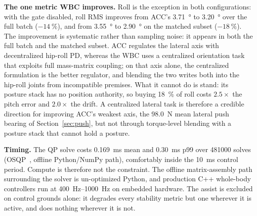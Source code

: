 \documentclass[a4paper,fleqn]{cas-dc}
\begin{document}
\medskip\noindent\textbf{The one metric WBC improves.}
Roll is the exception in both configurations: with the gate disabled, roll RMS improves from ACC's \SI{3.71}{\degree} to \SI{3.20}{\degree} over the full batch ($-\SI{14}{\percent}$), and from \SI{3.55}{\degree} to \SI{2.90}{\degree} on the matched subset ($-\SI{18}{\percent}$).
The improvement is systematic rather than sampling noise: it appears in both the full batch and the matched subset.
ACC regulates the lateral axis with decentralized hip-roll PD, whereas the WBC uses a centralized orientation task that exploits full mass-matrix coupling; on that axis alone, the centralized formulation is the better regulator, and blending the two writes both into the hip-roll joints from incompatible premises.
What it cannot do is stand: its posture stack has no position authority, so buying \SI{18}{\percent} of roll costs $\num{2.5}\times$ the pitch error and $\num{2.0}\times$ the drift.
A centralized lateral task is therefore a credible direction for improving ACC's weakest axis, the \SI{98.0}{N} mean lateral push bearing of Section~\ref{sec:push}, but not through torque-level blending with a posture stack that cannot hold a posture.

\medskip\noindent\textbf{Timing.}
The QP solve costs \SI{0.169}{ms} mean and \SI{0.30}{ms} p99 over \num{481000} solves (OSQP~\cite{stellato2020osqp}, offline Python/NumPy path), comfortably inside the \SI{10}{ms} control period.
Compute is therefore not the constraint. The offline matrix-assembly path
surrounding the solver is un-optimized Python, and production C++ whole-body
controllers run at \SIrange{400}{1000}{Hz} on embedded hardware.
The assist is excluded on control grounds alone: it degrades every stability metric but one wherever it is active, and does nothing wherever it is not.
\end{document}
